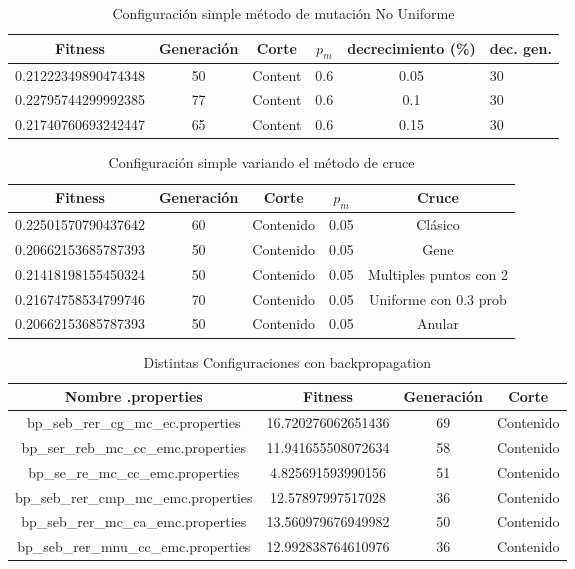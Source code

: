 \documentclass{sig-alternate}
\begin{document}
\begin{table}[htp]
	\begin{center}
	\begin{tabular}{|c|c|c|c|c|p{1cm}|}
		\hline
	     Fitness & Generación & Corte & $p_{m}$ & decrecimiento (\%) & dec. gen. \\
		\hline
		0.21222349890474348 & 50 & Content & 0.6 & 0.05 & 30 \\
		0.22795744299992385 & 77 & Content & 0.6 & 0.1  & 30 \\
		0.21740760693242447 & 65 & Content & 0.6 & 0.15 & 30 \\
		\hline
	\end{tabular}
	\caption{Configuración simple método de mutación No Uniforme}
	\label{table:simple_mutation_no_uniform}
	\end{center}
\end{table}

\begin{table}[htp]
	\begin{center}
	\begin{tabular}{|c|c|c|c|c|}
		\hline
	     Fitness & Generación & Corte & $p_{m}$ & Cruce \\
		\hline
		0.22501570790437642 & 60 & Contenido & 0.05 & Clásico \\
		0.20662153685787393 & 50 & Contenido & 0.05 & Gene \\
		0.21418198155450324 & 50 & Contenido & 0.05 & Multiples puntos con 2 \\
		0.21674758534799746 & 70 & Contenido & 0.05 & Uniforme con 0.3 prob \\
		0.20662153685787393 & 50 & Contenido & 0.05 & Anular \\
		\hline
	\end{tabular}
	\caption{Configuración simple variando el método de cruce}
	\label{table:crossover}
	\end{center}
\end{table}

\begin{table}[htp]
	\begin{center}
	\begin{tabular}{|c|c|c|c|}
		\hline
	     Nombre .properties & Fitness & Generación & Corte \\
		\hline
		bp\_seb\_rer\_cg\_mc\_ec.properties 		& 16.720276062651436 	& 69 & Contenido \\
		bp\_ser\_reb\_mc\_cc\_emc.properties 	& 11.941655508072634 	& 58 & Contenido \\
		bp\_se\_re\_mc\_cc\_emc.properties 		& 4.825691593990156 	& 51 & Contenido \\
		bp\_seb\_rer\_cmp\_mc\_emc.properties 	& 12.57897997517028 	& 36 & Contenido \\
		bp\_seb\_rer\_mc\_ca\_emc.properties 	& 13.560979676949982 	& 50 & Contenido \\
		bp\_seb\_rer\_mnu\_cc\_emc.properties 	& 12.992838764610976 	& 36 & Contenido \\
		\hline
	\end{tabular}
	\caption{Distintas Configuraciones con backpropagation}
	\label{table:backpropagation}
	\end{center}
\end{table}
\end{document}
